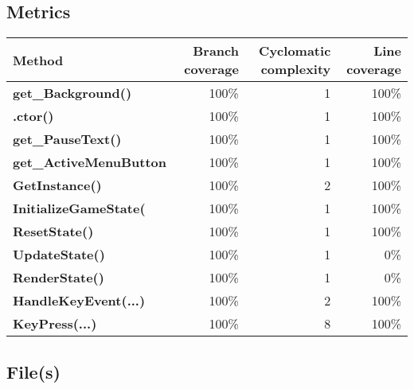 \documentclass[a4paper,landscape,10pt]{article}
\begin{document}
\subsection{Metrics}
\begin{longtable}[l]{|l|r|r|r|}
\hline
\textbf{Method} & \textbf{Branch coverage} & \textbf{Cyclomatic complexity} & \textbf{Line coverage}\\
\hline
\textbf{get\_Background()} & 100\% & 1 & 100\%\\
\hline
\textbf{.ctor()} & 100\% & 1 & 100\%\\
\hline
\textbf{get\_PauseText()} & 100\% & 1 & 100\%\\
\hline
\textbf{get\_ActiveMenuButton} & 100\% & 1 & 100\%\\
\hline
\textbf{GetInstance()} & 100\% & 2 & 100\%\\
\hline
\textbf{InitializeGameState(} & 100\% & 1 & 100\%\\
\hline
\textbf{ResetState()} & 100\% & 1 & 100\%\\
\hline
\textbf{UpdateState()} & 100\% & 1 & 0\%\\
\hline
\textbf{RenderState()} & 100\% & 1 & 0\%\\
\hline
\textbf{HandleKeyEvent(...)} & 100\% & 2 & 100\%\\
\hline
\textbf{KeyPress(...)} & 100\% & 8 & 100\%\\
\hline
\end{longtable}
\subsection{File(s)}
\end{document}
